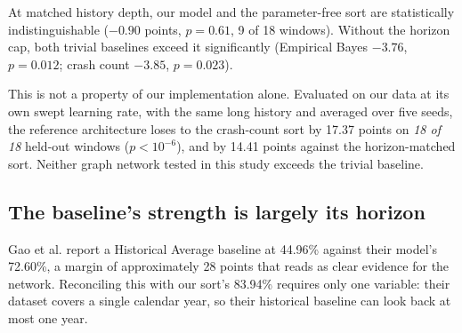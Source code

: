 \documentclass[conference]{IEEEtran}
\begin{document}
At matched history depth, our model and the parameter-free sort are
statistically indistinguishable ($-0.90$ points, $p=0.61$, 9 of 18
windows). Without the horizon cap, both trivial baselines exceed it
significantly (Empirical Bayes $-3.76$, $p=0.012$; crash count $-3.85$,
$p=0.023$).

This is not a property of our implementation alone. Evaluated on our data
at its own swept learning rate, with the same long history and averaged
over five seeds, the reference architecture loses to the crash-count sort
by 17.37 points on \emph{18 of 18} held-out windows ($p<10^{-6}$), and by
14.41 points against the horizon-matched sort. Neither graph network
tested in this study exceeds the trivial baseline.

\subsection{The baseline's strength is largely its horizon}
\label{sec:horizon}

Gao et al. report a Historical Average baseline at 44.96\% against their
model's 72.60\%, a margin of approximately 28 points that reads as clear
evidence for the network. Reconciling this with our sort's 83.94\%
requires only one variable: their dataset covers a single calendar year,
so their historical baseline can look back at most one year.
\end{document}
